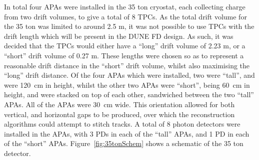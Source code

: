 In total four APAs were installed in the 35 ton cryostat, each collecting charge from two drift volumes, to give a total of 8 TPCs. As the total drift volume for the 35 ton was limited to around 2.5 m, it was not possible to use TPCs with the drift length which will be present in the DUNE FD design. As such, it was decided that the TPCs would either have a ``long'' drift volume of 2.23 m, or a ``short'' drift volume of 0.27 m. These lengths were chosen so as to represent a reasonable drift distance in the ``short'' drift volume, whilst also maximising the ``long'' drift distance. Of the four APAs which were installed, two were ``tall'', and were 120~cm in height, whilst the other two APAs were ``short'', being 60~cm in height, and were stacked on top of each other, sandwiched between the two ``tall'' APAs. All of the APAs were 30~cm wide. This orientation allowed for both vertical, and horizontal gaps to be produced, over which the reconstruction algorithms could attempt to stitch tracks. A total of 8 photon detectors were installed in the APAs, with 3 PDs in each of the ``tall'' APAs, and 1 PD in each of the ``short'' APAs. Figure~\ref{fig:35tonSchem} shows a schematic of the 35 ton detector. \\

